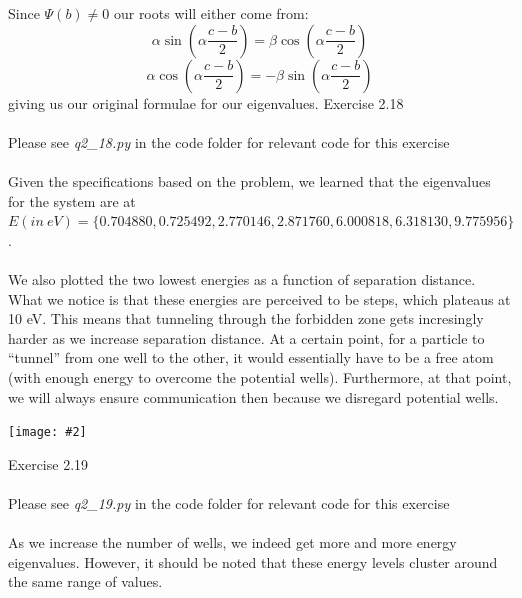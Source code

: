 \documentclass[10pt]{article} %
\newcommand{\centerfig}[2]{\begin{center}\texttt{[image: \#2]}\end{center}}
\begin{document}
Since $\Psi(b) \neq 0$ our roots will either come from:
\begin{equation}
\alpha \sin\left(\alpha \frac{c-b}{2} \right) = \beta\cos\left(\alpha \frac{c-b}{2} \right)
\end{equation}
\begin{equation}
\alpha \cos\left(\alpha \frac{c-b}{2} \right) = - \beta \sin\left(\alpha \frac{c-b}{2} \right)
\end{equation}
giving us our original formulae for our eigenvalues.
\newpage
\noindent \Large{Exercise 2.18}
\\ \\
\normalsize{Please see \textit{q2\_18.py} in the code folder for relevant code for this exercise}
\\ \\
\noindent Given the specifications based on the problem, we learned that the eigenvalues for the system are at $E(in\ eV) = \{0.704880, 0.725492, 2.770146, 2.871760, 6.000818, 6.318130, 9.775956\}$.
\\ \\
\noindent We also plotted the two lowest energies as a function of separation distance. What we notice is that these energies are perceived to be steps, which plateaus at 10 eV. This means that tunneling through the forbidden zone gets incresingly harder as we increase separation distance. At a certain point, for a particle to ``tunnel'' from one well to the other, it would essentially have to be a free atom (with enough energy to overcome the potential wells). Furthermore, at that point, we will always ensure communication then because we disregard potential wells.
\centerfig{.75}{../figs/q2_18.png}
\newpage
\noindent\Large{Exercise 2.19}
\\ \\
\normalsize{Please see \textit{q2\_19.py} in the code folder for relevant code for this exercise}
\\ \\
As we increase the number of wells, we indeed get more and more energy eigenvalues. However, it should be noted that these energy levels cluster around the same range of values.
\end{document}
